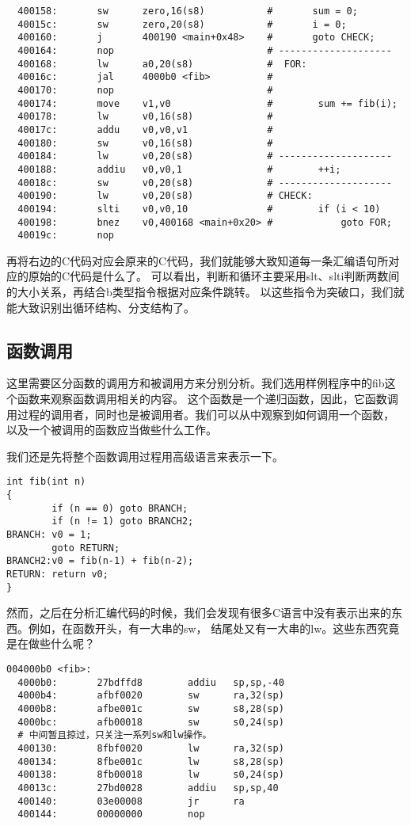 \begin{verbatim}
  400158:       sw      zero,16(s8)           #       sum = 0;
  40015c:       sw      zero,20(s8)           #       i = 0;
  400160:       j       400190 <main+0x48>    #       goto CHECK;
  400164:       nop                           # --------------------
  400168:       lw      a0,20(s8)             #  FOR:
  40016c:       jal     4000b0 <fib>          #
  400170:       nop                           #
  400174:       move    v1,v0                 #        sum += fib(i);
  400178:       lw      v0,16(s8)             #
  40017c:       addu    v0,v0,v1              #
  400180:       sw      v0,16(s8)             #
  400184:       lw      v0,20(s8)             # --------------------
  400188:       addiu   v0,v0,1               #        ++i;
  40018c:       sw      v0,20(s8)             # --------------------
  400190:       lw      v0,20(s8)             # CHECK:
  400194:       slti    v0,v0,10              #        if (i < 10)
  400198:       bnez    v0,400168 <main+0x20> #            goto FOR;
  40019c:       nop
\end{verbatim}

再将右边的C代码对应会原来的C代码，我们就能够大致知道每一条汇编语句所对应的原始的C代码是什么了。
可以看出，判断和循环主要采用slt、slti判断两数间的大小关系，再结合b类型指令根据对应条件跳转。
以这些指令为突破口，我们就能大致识别出循环结构、分支结构了。

\subsection{函数调用}
这里需要区分函数的调用方和被调用方来分别分析。我们选用样例程序中的fib这个函数来观察函数调用相关的内容。
这个函数是一个递归函数，因此，它函数调用过程的调用者，同时也是被调用者。我们可以从中观察到如何调用一个函数，
以及一个被调用的函数应当做些什么工作。

我们还是先将整个函数调用过程用高级语言来表示一下。
\begin{verbatim}
int fib(int n)
{
        if (n == 0) goto BRANCH;
        if (n != 1) goto BRANCH2;
BRANCH: v0 = 1;
        goto RETURN;
BRANCH2:v0 = fib(n-1) + fib(n-2);
RETURN: return v0;
}
\end{verbatim}

然而，之后在分析汇编代码的时候，我们会发现有很多C语言中没有表示出来的东西。例如，在函数开头，有一大串的sw，
结尾处又有一大串的lw。这些东西究竟是在做些什么呢？

\begin{verbatim}
004000b0 <fib>:
  4000b0:       27bdffd8        addiu   sp,sp,-40
  4000b4:       afbf0020        sw      ra,32(sp)
  4000b8:       afbe001c        sw      s8,28(sp)
  4000bc:       afb00018        sw      s0,24(sp)
  # 中间暂且掠过，只关注一系列sw和lw操作。
  400130:       8fbf0020        lw      ra,32(sp)
  400134:       8fbe001c        lw      s8,28(sp)
  400138:       8fb00018        lw      s0,24(sp)
  40013c:       27bd0028        addiu   sp,sp,40
  400140:       03e00008        jr      ra
  400144:       00000000        nop
\end{verbatim}

